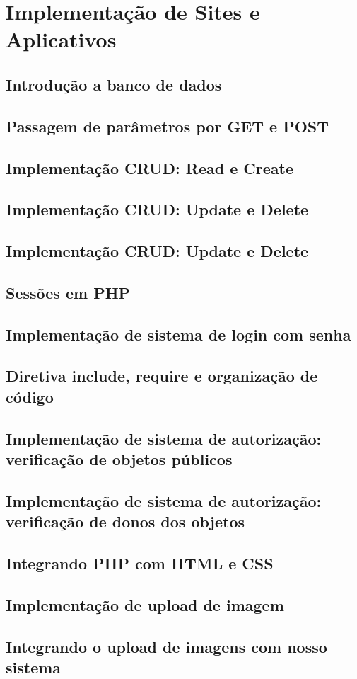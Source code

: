 \section{Implementação de Sites e Aplicativos}

\subsection{Introdução a banco de dados}
\subsection{Passagem de parâmetros por GET e POST}
\subsection{Implementação CRUD: Read e Create}
\subsection{Implementação CRUD: Update e Delete}
\subsection{Implementação CRUD: Update e Delete}
\subsection{Sessões em PHP}
\subsection{Implementação de sistema de login com senha}
\subsection{Diretiva include, require e organização de código}
\subsection{Implementação de sistema de autorização: verificação de objetos públicos}
\subsection{Implementação de sistema de autorização: verificação de donos dos objetos}
\subsection{Integrando PHP com HTML e CSS}
\subsection{Implementação de upload de imagem}
\subsection{Integrando o upload de imagens com nosso sistema}
